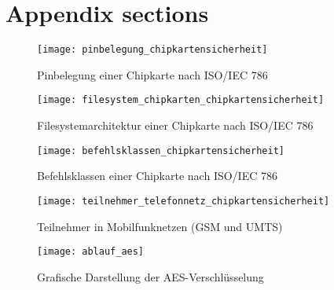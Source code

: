 \section{Appendix sections}

 \begin{figure}[htp]
  \begin{center}
   \texttt{[image: pinbelegung\_chipkartensicherheit]}
  \end{center}
  \caption[Pinbelegung einer Chipkarte]{Pinbelegung einer Chipkarte nach ISO/IEC 786 \cite{spitz11}}
  \label{abb:pinbelegung_chipkarten}
 \end{figure}

 \begin{figure}[htp]
  \begin{center}
   \texttt{[image: filesystem\_chipkarten\_chipkartensicherheit]}
  \end{center}
  \caption[Filesystemarchitektur einer Chipkarte]{Filesystemarchitektur einer Chipkarte nach ISO/IEC 786 \cite{spitz11}}
  \label{abb:filesystem_chipkarten}
 \end{figure}

  \begin{figure}[htp]
  \begin{center}
   \texttt{[image: befehlsklassen\_chipkartensicherheit]}
  \end{center}
  \caption[Befehlsklassen einer Chipkarte]{Befehlsklassen einer Chipkarte nach ISO/IEC 786 \cite{spitz11}}
  \label{abb:befehlsklassen_chipkarten}
 \end{figure}

  \begin{figure}[htp]
  \begin{center}
   \texttt{[image: teilnehmer\_telefonnetz\_chipkartensicherheit]}
  \end{center}
  \caption[Teilnehmer in Mobilfunknetzen]{Teilnehmer in Mobilfunknetzen (GSM und UMTS) \cite{spitz11}}
  \label{abb:teilnehmer_telefonnetz}
 \end{figure}

  \begin{figure}[htp]
  \begin{center}
   \texttt{[image: ablauf\_aes]}
  \end{center}
  \caption[Grafische Darstellung der AES-Verschlüsselung]{Grafische Darstellung der AES-Verschlüsselung \cite{paar10}}
  \label{abb:funktion_aes}
 \end{figure}
 
